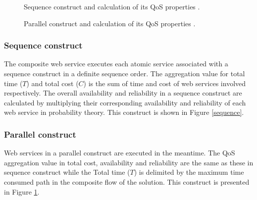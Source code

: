 \documentclass{llncs}
\begin{document}
\begin{figure}[h]
\centerline{
}
\caption{Sequence construct and calculation of its QoS properties
\cite{yu2013adaptive}.}
\label{sequence}
\vspace{0.3cm}
\centerline{
}
\caption{Parallel construct and calculation of its QoS properties
\cite{yu2013adaptive}.}
\label{parallel}
\end{figure}

\subsubsection{Sequence construct}
The composite web service executes each atomic service associated with a sequence construct in a definite sequence order. The aggregation value for total time ($T$) and total cost ($C$) is the sum of time and cost of web services involved respectively. The overall availability and reliability in a sequence construct are calculated by multiplying their corresponding availability and reliability of each web service in probability theory. This construct is shown in Figure \ref{sequence}.
\subsubsection{Parallel construct}
Web services in a parallel construct are executed in the meantime. The QoS aggregation value in total cost, availability and reliability are the same as these in sequence construct while the Total time ($T$) is delimited by the maximum time consumed path in the composite flow of the solution. This construct is presented in Figure \ref{parallel}.
\end{document}
